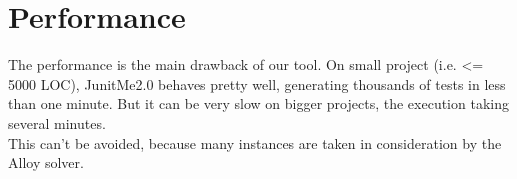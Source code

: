 \section{Performance}
\label{sec:Performance}
	The performance is the main drawback of our tool. On small project (i.e. <= 5000 LOC), JunitMe2.0 behaves pretty well, generating thousands of tests in less than one minute. But it can be very slow on bigger projects, the execution taking several minutes.\\
	This can't be avoided, because many instances are taken in consideration by the Alloy solver.